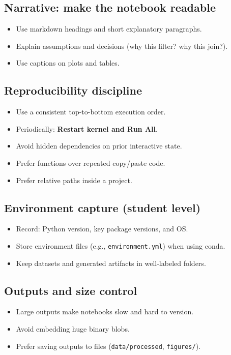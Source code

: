 \subsection{Narrative: make the notebook readable}
\begin{itemize}
\item Use markdown headings and short explanatory paragraphs.
\item Explain assumptions and decisions (why this filter? why this join?).
\item Use captions on plots and tables.
\end{itemize}

\subsection{Reproducibility discipline}
\begin{itemize}
\item Use a consistent top-to-bottom execution order.
\item Periodically: \textbf{Restart kernel and Run All}.
\item Avoid hidden dependencies on prior interactive state.
\item Prefer functions over repeated copy/paste code.
\item Prefer relative paths inside a project.
\end{itemize}

\subsection{Environment capture (student level)}
\begin{itemize}
\item Record: Python version, key package versions, and OS.
\item Store environment files (e.g., \texttt{environment.yml}) when using conda.
\item Keep datasets and generated artifacts in well-labeled folders.
\end{itemize}

\subsection{Outputs and size control}
\begin{itemize}
\item Large outputs make notebooks slow and hard to version.
\item Avoid embedding huge binary blobs.
\item Prefer saving outputs to files (\texttt{data/processed}, \texttt{figures/}).
\end{itemize}

